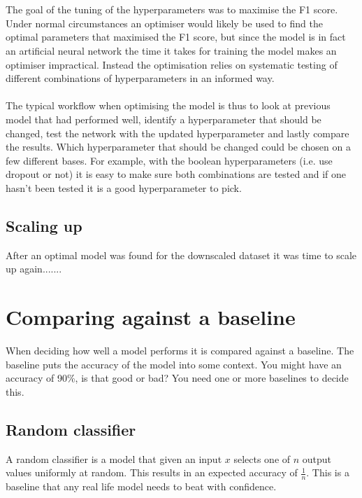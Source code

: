 \\\\
The goal of the tuning of the hyperparameters was to maximise the F1 score. Under normal circumstances an optimiser would likely be used to find the optimal parameters that maximised the F1 score, but since the model is in fact an artificial neural network the time it takes for training the model makes an optimiser impractical. Instead the optimisation relies on systematic testing of different combinations of hyperparameters in an informed way.
\\\\
The typical workflow when optimising the model is thus to look at previous model that had performed well, identify a hyperparameter that should be changed, test the network with the updated hyperparameter and lastly compare the results. Which hyperparameter that should be changed could be chosen on a few different bases. For example, with the boolean hyperparameters (i.e. use dropout or not) it is easy to make sure both combinations are tested and if one hasn't been tested it is a good hyperparameter to pick.
\subsection{Scaling up}
After an optimal model was found for the downscaled dataset it was time to scale up again....... 
\section{Comparing against a baseline}
When deciding how well a model performs it is compared against a baseline. The baseline puts the accuracy of the model into some context. You might have an accuracy of 90\%, is that good or bad? You need one or more baselines to decide this. 
\subsection{Random classifier}
A random classifier is a model that given an input $x$ selects one of $n$ output values uniformly at random. This results in an expected accuracy of $\frac{1}{n}$. This is a baseline that any real life model needs to beat with confidence.

